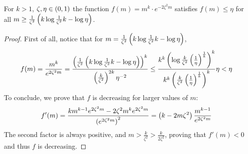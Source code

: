     \lemma\label{ineq_5.13}
        For $k > 1$, $\zeta, \eta \in \left( 0,1 \right)$ the function $f(m) = m^k \cdot e^{-2 \zeta^2 m}$ satisfies
        $f(m) \leq \eta$ for all $m \geq \frac{1}{\zeta^2}\left( k \log{\frac{1}{\zeta^2} k} - \log{\eta} \right)$.
        \begin{proof}
            First of all, notice that for $m = \frac{1}{\zeta^2}\left( k \log{\frac{1}{\zeta^2} k} - \log{\eta} \right)$,
            \[
                f(m) = \frac{m^k}{e^{2 \zeta^2 m}}
                     = \frac{\left( \frac{1}{\zeta^2}\left( k \log{\frac{1}{\zeta^2} k} - \log{\eta} \right) \right)^k}{
                        \left( \frac{k}{\zeta^2} \right)^{2k} \eta^{-2}}
                     \leq \frac{k^k \left( \log{\frac{k}{\zeta^2}\left( \frac{1}{\eta} \right)^{\frac{1}{k}}} \right)^k}
                        {k^k \left( \frac{k}{\zeta^2} \left( \frac{1}{\eta} \right)^{\frac{1}{k}} \right)^k} \eta
                     < \eta
            \]
            To conclude, we prove that $f$ is decreasing for larger values of $m$:
            \[
                f'(m)
                    = \frac{k m^{k-1} e^{2 \zeta^2 m} - 2 \zeta^2 m^k e^{2 \zeta^2 m}}{\left( e^{2 \zeta^2 m} \right)^2}
                    = \left( k - 2m\zeta^2 \right) \frac{m^{k-1}}{e^{2 \zeta^2 m}}
            \]
            The second factor is always positive, and $m > \frac{k}{\zeta^2} > \frac{k}{2\zeta^2}$, proving that $f'(m) < 0$
            and thus $f$ is decreasing.
        \end{proof}


